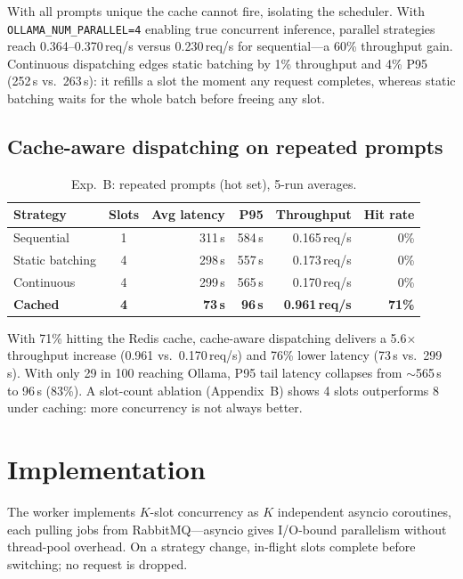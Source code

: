 \documentclass[10pt,a4paper]{article}
\begin{document}
With all prompts unique the cache cannot fire, isolating the scheduler.
With \texttt{OLLAMA\_NUM\_PARALLEL=4} enabling true concurrent inference,
parallel strategies reach 0.364--0.370\,req/s versus 0.230\,req/s for sequential---a
60\% throughput gain. Continuous dispatching edges static batching by 1\% throughput
and 4\% P95 (252\,s vs.\ 263\,s): it refills a slot the moment any request completes,
whereas static batching waits for the whole batch before freeing any slot.

\subsection*{Cache-aware dispatching on repeated prompts}

\begin{table}[H]
\centering
\caption{Exp.~B: repeated prompts (hot set), 5-run averages.}
\label{tab:expb}
\small\setlength{\tabcolsep}{6pt}
\begin{tabular}{lcrrrr}
\toprule
Strategy          & Slots & Avg latency & P95     & Throughput   & Hit rate \\
\midrule
Sequential        & 1     & 311\,s      & 584\,s  & 0.165\,req/s & 0\%  \\
Static batching   & 4     & 298\,s      & 557\,s  & 0.173\,req/s & 0\%  \\
Continuous        & 4     & 299\,s      & 565\,s  & 0.170\,req/s & 0\%  \\
\bfseries Cached  & \bfseries 4 & \bfseries 73\,s &
\bfseries 96\,s & \bfseries 0.961\,req/s & \bfseries 71\% \\
\bottomrule
\end{tabular}
\end{table}

With 71\% hitting the Redis cache, cache-aware dispatching delivers a
5.6$\times$ throughput increase (0.961 vs.\ 0.170\,req/s) and 76\% lower latency
(73\,s vs.\ 299\,s). With only 29 in 100 reaching Ollama, P95 tail latency collapses
from $\sim$565\,s to 96\,s (83\%).
A slot-count ablation (Appendix~B) shows 4 slots outperforms 8 under caching:
more concurrency is not always better.


\section{Implementation}

The worker implements $K$-slot concurrency as $K$ independent asyncio coroutines, each
pulling jobs from RabbitMQ---asyncio gives I/O-bound parallelism without thread-pool
overhead. On a strategy change, in-flight slots complete before switching; no request
is dropped.
\end{document}
